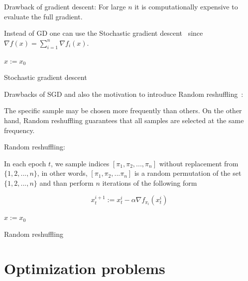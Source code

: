 \documentclass[10pt,conference,compsocconf]{IEEEtran}
\begin{document}
\medskip

Drawback of gradient descent: For large $n$ it is computationally
expensive to evaluate the full gradient.

Instead of GD one can use the Stochastic gradient descent~\cite{SGD} since
$\nabla f(x) = \sum_{i=1}^n \nabla f_i(x)$.

\begin{algorithm}
\SetAlgoLined

  $x:= x_0$ \\
 
 \caption{Stochastic gradient descent}
\end{algorithm}

\medskip

Drawbacks of SGD and also the motivation to introduce Random
reshuffling~\cite{COMPONENTFUNCTION}:

\noindent The specific sample may be chosen more frequently than others. On the
other hand, Random reshuffling guarantees that all samples are selected at
the same frequency.

\medskip

\noindent Random reshuffling:

\noindent In each epoch $t$, we sample indices $[\pi_1, \pi_2,..., \pi_n]$
without replacement from $\{1, 2,..., n\}$, in other words,
$[\pi_1, \pi_2,...\pi_n]$ is a random permutation of the
set $\{1, 2,..., n\}$ and than perform $n$ iterations of the following
form

$$x_t^{i+1} := x_t^i - \alpha \nabla f_{\pi_i}(x_t^i)$$

\begin{algorithm}
\SetAlgoLined

  $x:= x_0$ \\
 
 \caption{Random reshuffling}
\end{algorithm}

\section{Optimization problems}
\end{document}
